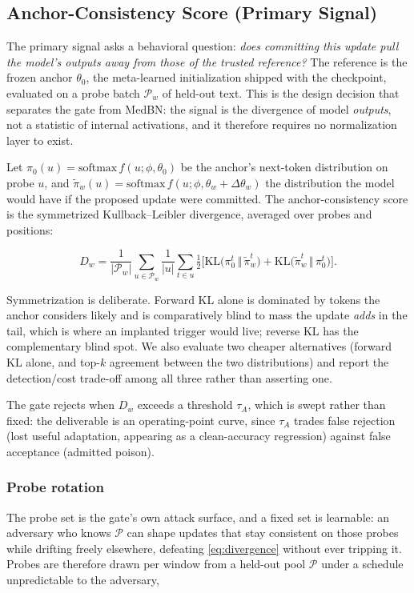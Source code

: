 \documentclass[journal]{IEEEtran}
\newcommand{\slow}{\phi}
\newcommand{\fast}{\theta}
\newcommand{\anchorp}{\theta_{0}}
\newcommand{\dtheta}{\Delta\theta}
\begin{document}
\subsection{Anchor-Consistency Score (Primary Signal)}
\label{sec:anchor}

The primary signal asks a behavioral question: \emph{does committing this update
pull the model's outputs away from those of the trusted reference?} The reference is
the frozen anchor $\anchorp$, the meta-learned initialization shipped with the
checkpoint, evaluated on a probe batch $\mathcal{P}_w$ of held-out text. This is
the design decision that separates the gate from MedBN: the signal is the divergence
of model \emph{outputs}, not a statistic of internal activations, and it therefore
requires no normalization layer to exist.

Let $\pi_{0}(u) = \mathrm{softmax}\, f(u;\slow,\anchorp)$ be the anchor's next-token
distribution on probe $u$, and $\tilde{\pi}_{w}(u) = \mathrm{softmax}\,
f(u;\slow,\fast_w + \dtheta_w)$ the distribution the model would have if the
proposed update were committed. The anchor-consistency score is the symmetrized
Kullback--Leibler divergence, averaged over probes and positions:

\begin{equation}
D_w = \frac{1}{|\mathcal{P}_w|}\sum_{u \in \mathcal{P}_w}
\frac{1}{|u|}\sum_{t \in u}
\tfrac{1}{2}\Big[
\mathrm{KL}\big(\pi_{0}^{t} \,\Vert\, \tilde{\pi}_{w}^{t}\big)
+ \mathrm{KL}\big(\tilde{\pi}_{w}^{t} \,\Vert\, \pi_{0}^{t}\big)
\Big].
\label{eq:divergence}
\end{equation}

Symmetrization is deliberate. Forward KL alone is dominated by tokens the anchor
considers likely and is comparatively blind to mass the update \emph{adds} in the
tail, which is where an implanted trigger would live; reverse KL has the
complementary blind spot. We also evaluate two cheaper alternatives (forward KL
alone, and top-$k$ agreement between the two distributions) and report the
detection/cost trade-off among all three rather than asserting one.

The gate rejects when $D_w$ exceeds a threshold $\tau_{A}$, which is swept rather
than fixed: the deliverable is an operating-point curve, since $\tau_A$ trades false
rejection (lost useful adaptation, appearing as a clean-accuracy regression) against
false acceptance (admitted poison).

\subsubsection{Probe rotation}
The probe set is the gate's own attack surface, and a fixed set is learnable: an
adversary who knows $\mathcal{P}$ can shape updates that stay consistent on those
probes while drifting freely elsewhere, defeating \eqref{eq:divergence} without ever
tripping it. Probes are therefore drawn per window from a held-out pool
$\mathcal{P}$ under a schedule unpredictable to the adversary,
\end{document}
